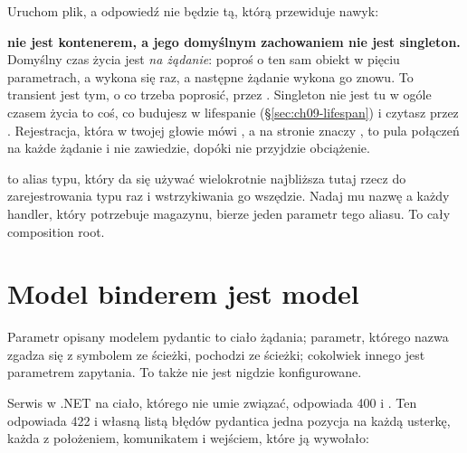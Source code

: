 
\noindent
Uruchom plik, a odpowiedź nie będzie tą, którą przewiduje nawyk:


\begin{trapbox}
\textbf{ nie jest kontenerem, a jego domyślnym zachowaniem nie
jest singleton.} Domyślny czas życia jest \emph{na żądanie}: poproś o ten sam
obiekt w pięciu parametrach, a wykona się raz, a następne żądanie wykona go
znowu. To transient jest tym, o co trzeba poprosić, przez
. Singleton nie jest tu w ogóle czasem
życia \dash{} to coś, co budujesz w lifespanie (\S\ref{sec:ch09-lifespan}) i
czytasz przez . Rejestracja, która w twojej głowie mówi
, a na stronie znaczy , to pula połączeń na
każde żądanie i nie zawiedzie, dopóki nie przyjdzie obciążenie.
\end{trapbox}


\begin{csbox}
 to alias typu, który da się
używać wielokrotnie \dash{} najbliższa tutaj rzecz do zarejestrowania typu raz
i wstrzykiwania go wszędzie. Nadaj mu nazwę \dash{}  \dash{} a
każdy handler, który potrzebuje magazynu, bierze jeden parametr tego aliasu.
To cały composition root.
\end{csbox}

\section{Model binderem jest model}
\label{sec:ch09-validation}

Parametr opisany modelem pydantic to ciało żądania; parametr, którego nazwa
zgadza się z symbolem ze ścieżki, pochodzi ze ścieżki; cokolwiek innego jest
parametrem zapytania. To także nie jest nigdzie konfigurowane.


\noindent
Serwis w .NET na ciało, którego nie umie związać, odpowiada 400 i
. Ten odpowiada 422 i własną listą błędów pydantica
\dash{} jedna pozycja na każdą usterkę, każda z położeniem, komunikatem i
wejściem, które ją wywołało:

